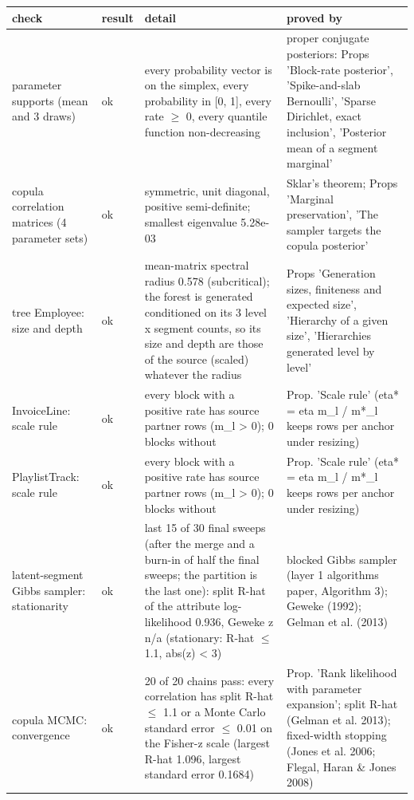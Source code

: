 \documentclass[10pt]{article}
\begin{document}
{\footnotesize\begin{longtable}{p{3.2cm}p{1cm}p{7.2cm}p{4.2cm}}
check & result & detail & proved by \\ \hline
parameter supports (mean and 3 draws) & ok & every probability vector is on the simplex, every probability in [0, 1], every rate $\geq$ 0, every quantile function non-decreasing & proper conjugate posteriors: Props 'Block-rate posterior', 'Spike-and-slab Bernoulli', 'Sparse Dirichlet, exact inclusion', 'Posterior mean of a segment marginal' \\
copula correlation matrices (4 parameter sets) & ok & symmetric, unit diagonal, positive semi-definite; smallest eigenvalue 5.28e-03 & Sklar's theorem; Props 'Marginal preservation', 'The sampler targets the copula posterior' \\
tree Employee: size and depth & ok & mean-matrix spectral radius 0.578 (subcritical); the forest is generated conditioned on its 3 level x segment counts, so its size and depth are those of the source (scaled) whatever the radius & Props 'Generation sizes, finiteness and expected size', 'Hierarchy of a given size', 'Hierarchies generated level by level' \\
InvoiceLine: scale rule & ok & every block with a positive rate has source partner rows (m\_l \textgreater{} 0); 0 blocks without & Prop. 'Scale rule' (eta* = eta m\_l / m*\_l keeps rows per anchor under resizing) \\
PlaylistTrack: scale rule & ok & every block with a positive rate has source partner rows (m\_l \textgreater{} 0); 0 blocks without & Prop. 'Scale rule' (eta* = eta m\_l / m*\_l keeps rows per anchor under resizing) \\
latent-segment Gibbs sampler: stationarity & ok & last 15 of 30 final sweeps (after the merge and a burn-in of half the final sweeps; the partition is the last one): split R-hat of the attribute log-likelihood 0.936, Geweke z n/a (stationary: R-hat $\leq$ 1.1, abs(z) \textless{} 3) & blocked Gibbs sampler (layer 1 algorithms paper, Algorithm 3); Geweke (1992); Gelman et al. (2013) \\
copula MCMC: convergence & ok & 20 of 20 chains pass: every correlation has split R-hat $\leq$ 1.1 or a Monte Carlo standard error $\leq$ 0.01 on the Fisher-z scale (largest R-hat 1.096, largest standard error 0.1684) & Prop. 'Rank likelihood with parameter expansion'; split R-hat (Gelman et al. 2013); fixed-width stopping (Jones et al. 2006; Flegal, Haran \& Jones 2008) \\
\end{longtable}}
\end{document}
